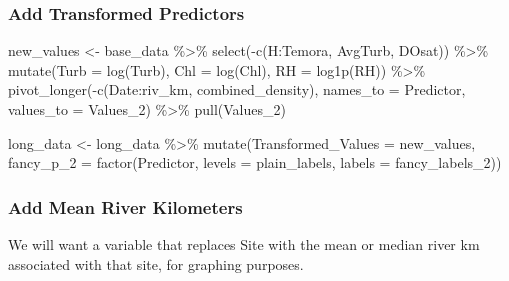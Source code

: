 \documentclass[
]{article}
\newenvironment{Shaded}{\begin{snugshade}}{\end{snugshade}}
\newcommand{\AttributeTok}[1]{\textcolor[rgb]{0.77,0.63,0.00}{#1}}
\newcommand{\FunctionTok}[1]{\textcolor[rgb]{0.00,0.00,0.00}{#1}}
\newcommand{\NormalTok}[1]{#1}
\newcommand{\OtherTok}[1]{\textcolor[rgb]{0.56,0.35,0.01}{#1}}
\newcommand{\SpecialCharTok}[1]{\textcolor[rgb]{0.00,0.00,0.00}{#1}}
\newcommand{\StringTok}[1]{\textcolor[rgb]{0.31,0.60,0.02}{#1}}
\begin{document}
\hypertarget{add-transformed-predictors}{%
\subsubsection{Add Transformed
Predictors}\label{add-transformed-predictors}}

\begin{Shaded}
\begin{Highlighting}[]
\NormalTok{new\_values }\OtherTok{\textless{}{-}}\NormalTok{ base\_data }\SpecialCharTok{\%\textgreater{}\%}
  \FunctionTok{select}\NormalTok{(}\SpecialCharTok{{-}}\FunctionTok{c}\NormalTok{(H}\SpecialCharTok{:}\NormalTok{Temora,  AvgTurb, DOsat)) }\SpecialCharTok{\%\textgreater{}\%}
  \FunctionTok{mutate}\NormalTok{(}\AttributeTok{Turb =} \FunctionTok{log}\NormalTok{(Turb),}
         \AttributeTok{Chl =} \FunctionTok{log}\NormalTok{(Chl),}
         \AttributeTok{RH =} \FunctionTok{log1p}\NormalTok{(RH)) }\SpecialCharTok{\%\textgreater{}\%}
  \FunctionTok{pivot\_longer}\NormalTok{(}\SpecialCharTok{{-}}\FunctionTok{c}\NormalTok{(Date}\SpecialCharTok{:}\NormalTok{riv\_km, combined\_density), }
               \AttributeTok{names\_to =} \StringTok{\textquotesingle{}Predictor\textquotesingle{}}\NormalTok{, }\AttributeTok{values\_to =} \StringTok{\textquotesingle{}Values\_2\textquotesingle{}}\NormalTok{) }\SpecialCharTok{\%\textgreater{}\%}
  \FunctionTok{pull}\NormalTok{(}\StringTok{\textquotesingle{}Values\_2\textquotesingle{}}\NormalTok{)}

\NormalTok{long\_data }\OtherTok{\textless{}{-}}\NormalTok{ long\_data }\SpecialCharTok{\%\textgreater{}\%}
  \FunctionTok{mutate}\NormalTok{(}\AttributeTok{Transformed\_Values =}\NormalTok{ new\_values,}
         \AttributeTok{fancy\_p\_2 =} \FunctionTok{factor}\NormalTok{(Predictor, }\AttributeTok{levels =}\NormalTok{ plain\_labels, }
                        \AttributeTok{labels =}\NormalTok{ fancy\_labels\_2))}
\end{Highlighting}
\end{Shaded}

\hypertarget{add-mean-river-kilometers}{%
\subsubsection{Add Mean River
Kilometers}\label{add-mean-river-kilometers}}

We will want a variable that replaces Site with the mean or median river
km associated with that site, for graphing purposes.
\end{document}
